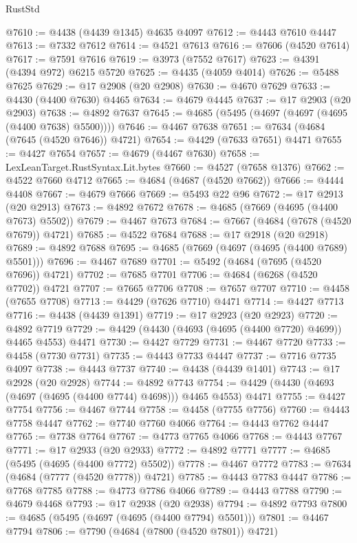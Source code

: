 \begin{lexlean}{RustStd}
\begin{coremodule}
@7610 := @4438 (@4439 @1345) @4635 @4097
@7612 := @4443 @7610 @4447
@7613 := @7332 @7612
@7614 := @4521 @7613
@7616 := @7606 (@4520 @7614)
@7617 := @7591 @7616
@7619 := @3973 (@7552 @7617)
@7623 := @4391 (@4394 @972) @6215 @5720
@7625 := @4435 (@4059 @4014)
@7626 := @5488 @7625
@7629 := @17 @2908 (@20 @2908)
@7630 := @4670 @7629
@7633 := @4430 (@4400 @7630) @4465
@7634 := @4679 @4445
@7637 := @17 @2903 (@20 @2903)
@7638 := @4892 @7637
@7645 := @4685 (@5495 (@4697 (@4697 (@4695 (@4400 @7638) @5500))))
@7646 := @4467 @7638
@7651 := @7634 (@4684 (@7645 (@4520 @7646)) @4721)
@7654 := @4429 (@7633 @7651) @4471
@7655 := @4427 @7654
@7657 := @4679 (@4467 @7630)
@7658 := LexLeanTarget.RustSyntax.Lit.bytes
@7660 := @4527 (@7658 @1376)
@7662 := @4522 @7660 @4712
@7665 := @4684 (@4687 (@4520 @7662))
@7666 := @4444 @4408
@7667 := @4679 @7666
@7669 := @5493 @22 @96
@7672 := @17 @2913 (@20 @2913)
@7673 := @4892 @7672
@7678 := @4685 (@7669 (@4695 (@4400 @7673) @5502))
@7679 := @4467 @7673
@7684 := @7667 (@4684 (@7678 (@4520 @7679)) @4721)
@7685 := @4522 @7684
@7688 := @17 @2918 (@20 @2918)
@7689 := @4892 @7688
@7695 := @4685 (@7669 (@4697 (@4695 (@4400 @7689) @5501)))
@7696 := @4467 @7689
@7701 := @5492 (@4684 (@7695 (@4520 @7696)) @4721)
@7702 := @7685 @7701
@7706 := @4684 (@6268 (@4520 @7702)) @4721
@7707 := @7665 @7706
@7708 := @7657 @7707
@7710 := @4458 (@7655 @7708)
@7713 := @4429 (@7626 @7710) @4471
@7714 := @4427 @7713
@7716 := @4438 (@4439 @1391)
@7719 := @17 @2923 (@20 @2923)
@7720 := @4892 @7719
@7729 := @4429 (@4430 (@4693 (@4695 (@4400 @7720) @4699)) @4465 @4553) @4471
@7730 := @4427 @7729
@7731 := @4467 @7720
@7733 := @4458 (@7730 @7731)
@7735 := @4443 @7733 @4447
@7737 := @7716 @7735 @4097
@7738 := @4443 @7737
@7740 := @4438 (@4439 @1401)
@7743 := @17 @2928 (@20 @2928)
@7744 := @4892 @7743
@7754 := @4429 (@4430 (@4693 (@4697 (@4695 (@4400 @7744) @4698))) @4465 @4553) @4471
@7755 := @4427 @7754
@7756 := @4467 @7744
@7758 := @4458 (@7755 @7756)
@7760 := @4443 @7758 @4447
@7762 := @7740 @7760 @4066
@7764 := @4443 @7762 @4447
@7765 := @7738 @7764
@7767 := @4773 @7765 @4066
@7768 := @4443 @7767
@7771 := @17 @2933 (@20 @2933)
@7772 := @4892 @7771
@7777 := @4685 (@5495 (@4695 (@4400 @7772) @5502))
@7778 := @4467 @7772
@7783 := @7634 (@4684 (@7777 (@4520 @7778)) @4721)
@7785 := @4443 @7783 @4447
@7786 := @7768 @7785
@7788 := @4773 @7786 @4066
@7789 := @4443 @7788
@7790 := @4679 @4468
@7793 := @17 @2938 (@20 @2938)
@7794 := @4892 @7793
@7800 := @4685 (@5495 (@4697 (@4695 (@4400 @7794) @5501)))
@7801 := @4467 @7794
@7806 := @7790 (@4684 (@7800 (@4520 @7801)) @4721)

\end{coremodule}
\end{lexlean}
